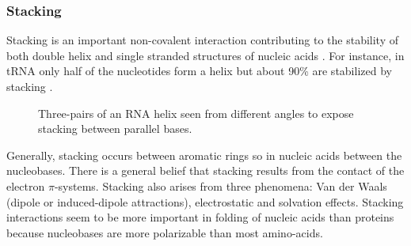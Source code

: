 \documentclass[12pt]{article}
\begin{document}
\subsubsection{Stacking}
\label{stacking-section}
Stacking is an important non-covalent interaction contributing to the stability of both double helix and single stranded structures of nucleic acids \cite{Hobza2008}. For instance, in tRNA only half of the nucleotides form a helix but about 90\% are stabilized by stacking \cite{Bloomfield1999}. 
\begin{figure} [h!]
\begin{center}
\caption{Three-pairs of an RNA helix seen from different angles to expose  stacking between parallel bases.}
\label{StackingHelix}
\end{center}
\end{figure} 
Generally, stacking occurs between aromatic rings so in nucleic acids between the nucleobases. There is a general belief that stacking results from the contact of the electron $\pi$-systems. Stacking also arises from three phenomena: Van der Waals (dipole or induced-dipole attractions), electrostatic and solvation effects. Stacking interactions seem to be more important in folding of nucleic acids than proteins because nucleobases are more polarizable than most amino-acids. 
\end{document}
